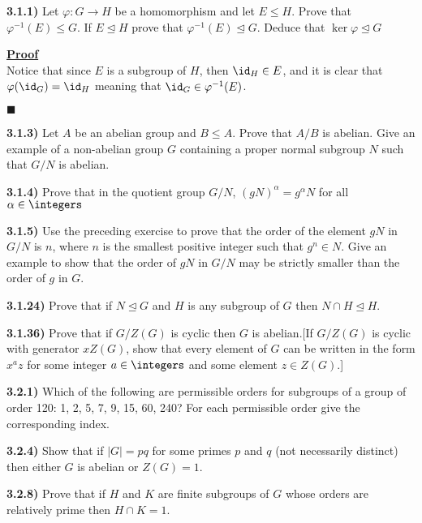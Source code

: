 \documentclass[12pt,a4paper]{article}
\newcommand{\prob}[2]{\textbf{#1)} #2}
\newenvironment{proof}
{
\textbf{\underline{Proof}} \\
}
{
\begin{flushright}
$\blacksquare$
\end{flushright}}
\begin{document}
\prob{3.1.1}{Let $\varphi: G \rightarrow H$ be a homomorphism and let $E \leq H$. Prove that $\varphi^{-1}(E) \leq G$. If $E \trianglelefteq H$ prove that $\varphi^{-1}(E) \trianglelefteq G$. Deduce that $\ker{\varphi} \trianglelefteq G$}

\begin{proof}
Notice that since $E$ is a subgroup of $H$, then $\id_H \in E$, and it is clear that $\varphi(\id_G) = \id_H$ meaning that $\id_G \in \varphi^{-1}(E)$. 
\end{proof}

\prob{3.1.3}{Let $A$ be an abelian group and $B \leq A$. Prove that $A/B$ is abelian. Give an example of a non-abelian group $G$ containing a proper normal subgroup $N$ such that $G/N$ is abelian.}

\prob{3.1.4}{Prove that in the quotient group $G/N$, $(gN)^{\alpha} = g^{\alpha}N$ for all $\alpha \in \integers$}

\prob{3.1.5}{Use the preceding exercise to prove that the order of the element $gN$ in $G/N$ is $n$, where $n$ is the smallest positive integer such that $g^n \in N$. Give an example to show that the order of $gN$ in $G/N$ may be strictly smaller than the order of $g$ in $G$.}

\prob{3.1.24}{Prove that if $N \trianglelefteq G$ and $H$ is any subgroup of $G$ then $N \cap H \trianglelefteq H$.}

\prob{3.1.36}{Prove that if $G/Z(G)$ is cyclic then $G$ is abelian.[If $G/Z(G)$ is cyclic with generator $xZ(G)$, show that every element of $G$ can be written in the form $x^az$ for some integer $a \in \integers$ and some element $z \in Z(G)$.] }

\prob{3.2.1}{Which of the following are permissible orders for subgroups of a group of order 120: 1, 2, 5, 7, 9, 15, 60, 240? For each permissible order give the corresponding index.}

\prob{3.2.4}{Show that if $|G| = pq$ for some primes $p$ and $q$ (not necessarily distinct) then either $G$ is abelian or $Z(G) = 1$.}

\prob{3.2.8}{Prove that if $H$ and $K$ are finite subgroups of $G$ whose orders are relatively prime then $H \cap K = 1$.}
\end{document}

